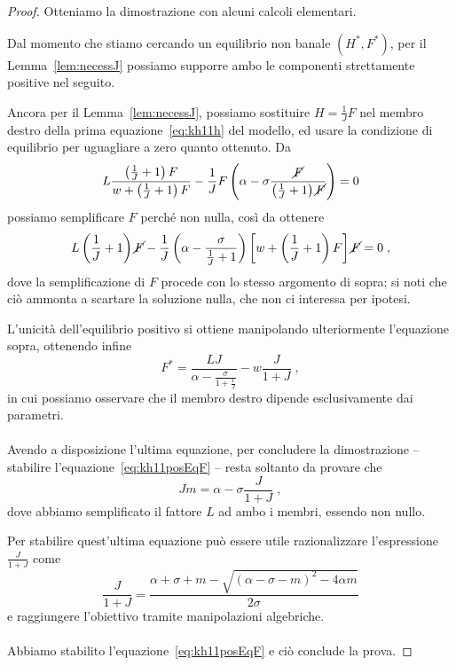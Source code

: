 \begin{proof}
    Otteniamo la dimostrazione con alcuni calcoli elementari.

    Dal momento che stiamo cercando un equilibrio non banale $(H^*, F^*)$, per il
    Lemma~\ref{lem:necessJ} possiamo supporre ambo le componenti strettamente positive nel seguito.

    Ancora per il Lemma~\ref{lem:necessJ}, possiamo sostituire $H=\frac{1}{J} F$ nel membro destro della
    prima equazione~\eqref{eq:kh11h} del modello, ed usare la condizione di equilibrio per uguagliare
    a zero quanto ottenuto. Da
    $$L \frac{ \left( \frac{1}{J} +1 \right) F }{ w +\left( \frac{1}{J} +1 \right) F }
    - \frac{1}{J} F \left( \alpha - \sigma \frac{\cancel{F}}{ \left( \frac{1}{J} +1 \right) \cancel{F} } \right) = 0$$
    possiamo semplificare $F$ perché non nulla, così da ottenere
    $$L \left( \frac{1}{J} +1 \right) \cancel{F} - \frac{1}{J} \left( \alpha - \frac{\sigma}{ \frac{1}{J} +1 } \right)
    \left[ w + \left( \frac{1}{J} +1 \right) F \right] \cancel{F} = 0 \; ,$$
    dove la semplificazione di $F$ procede con lo stesso argomento di sopra; si noti che ciò ammonta a scartare la
    soluzione nulla, che non ci interessa per ipotesi.

    L'unicità dell'equilibrio positivo si ottiene manipolando ulteriormente l'equazione sopra, ottenendo infine
    $$F^* = \frac{LJ}{ \alpha - \frac{\sigma}{ 1 + \frac{1}{J} } } - w \frac{J}{1+J} \; ,$$
    in cui possiamo osservare che il membro destro dipende esclusivamente dai parametri.

    \paragraph{}
    Avendo a disposizione l'ultima equazione, per concludere la dimostrazione -- \ie stabilire
    l'equazione~\eqref{eq:kh11posEqF} -- resta soltanto da provare che
    $$J m = \alpha - \sigma \frac{J}{1+J} \; ,$$
    dove abbiamo semplificato il fattore $L$ ad ambo i membri, essendo non nullo.

    Per stabilire quest'ultima equazione può essere utile razionalizzare l'espressione $\frac{J}{1+J}$ come
    $$\frac{J}{1+J} = \frac{ \alpha + \sigma + m - \sqrt{ {(\alpha - \sigma -m)}^2 - 4 \alpha m } }{2 \sigma}$$
    e raggiungere l'obiettivo tramite manipolazioni algebriche.

    \paragraph{}
    Abbiamo stabilito l'equazione~\eqref{eq:kh11posEqF} e ciò conclude la prova.
\end{proof}


